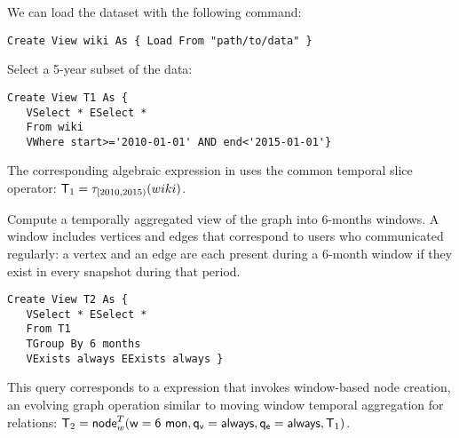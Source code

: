 
\begin{example}
\label{ex:load}

  
We can load the dataset with the following command:

\begin{small} 
\begin{verbatim}
Create View wiki As { Load From "path/to/data" }
\end{verbatim}
\end{small}


\end{example}

\begin{example}
\label{ex:slice}

Select a 5-year subset of the data:

\begin{small} 
\begin{verbatim}
Create View T1 As { 
   VSelect * ESelect *
   From wiki
   VWhere start>='2010-01-01' AND end<'2015-01-01'}
\end{verbatim}
\end{small}

The corresponding algebraic expression in \tra uses the common
temporal slice operator: $\mathsf{T}_1 = \tau_{[2010,2015)}(wiki)$.

\end{example}

\begin{example}
\label{ex:nodecrt}

Compute a temporally aggregated view of the graph into 6-months
windows.  A window includes vertices and edges that correspond to
users who communicated regularly: a vertex and an edge are each
present during a 6-month window if they exist in every snapshot during
that period.

\begin{small} 
\begin{verbatim}
Create View T2 As { 
   VSelect * ESelect *
   From T1
   TGroup By 6 months
   VExists always EExists always }
\end{verbatim}
\end{small}

This query corresponds to a \tra expression that invokes window-based
node creation, an evolving graph operation similar to moving window
temporal aggregation for relations:
$\mathsf{T}_2 = \textsf{node}^T_w(\mathsf{w=6~mon},\mathsf{q_v=always},\mathsf{q_e=always},\mathsf{T}_1)$.

\end{example}

